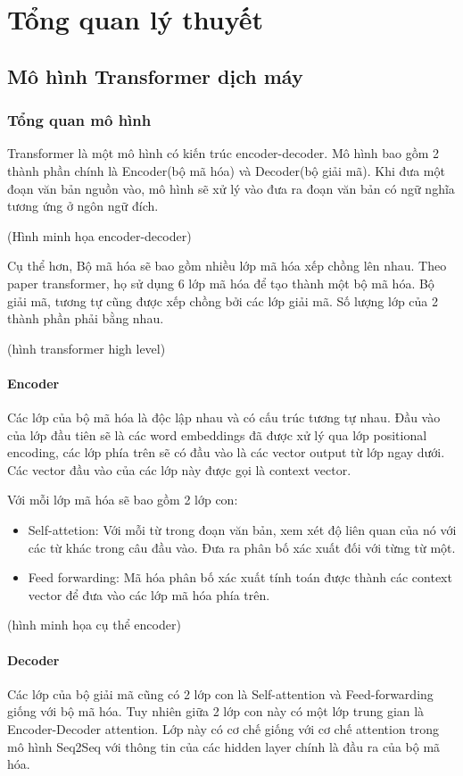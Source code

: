 \chapter{Tổng quan lý thuyết}
\label{Chapter2}
\section{Mô hình Transformer dịch máy}

\subsection{Tổng quan mô hình}

Transformer là một mô hình có kiến trúc encoder-decoder. Mô hình bao gồm 2 thành phần chính là Encoder(bộ mã hóa) và Decoder(bộ giải mã). Khi đưa một đoạn văn bản nguồn vào, mô hình sẽ xử lý vào đưa ra đoạn văn bản có ngữ nghĩa tương ứng ở ngôn ngữ đích.

(Hình minh họa encoder-decoder)

Cụ thể hơn, Bộ mã hóa sẽ bao gồm nhiều lớp mã hóa xếp chồng lên nhau. Theo paper transformer, họ sử dụng 6 lớp mã hóa để tạo thành một bộ mã hóa.  Bộ giải mã, tương tự cũng được xếp chồng bởi các lớp giải mã. Số lượng lớp của 2 thành phần phải bằng nhau.

(hình transformer high level)

\subsubsection{Encoder}
Các lớp của bộ mã hóa là độc lập nhau và có cấu trúc tương tự nhau. Đầu vào của lớp đầu tiên sẽ là các word embeddings đã được xử lý qua lớp positional encoding, các lớp phía trên sẽ có đầu vào là các vector output từ lớp ngay dưới. Các vector đầu vào của các lớp này được gọi là context vector.

Với mỗi lớp mã hóa sẽ bao gồm 2 lớp con:
\begin{itemize}
	\item Self-attetion: Với mỗi từ trong đoạn văn bản, xem xét độ liên quan của nó với các từ khác trong câu đầu vào. Đưa ra phân bố xác xuất đối với từng từ một.
	\item Feed forwarding: Mã hóa phân bố xác xuất tính toán được thành các context vector để đưa vào các lớp mã hóa phía trên.
\end{itemize}

(hình minh họa cụ thể encoder)

\subsubsection{Decoder}
Các lớp của bộ giải mã cũng có 2 lớp con là Self-attention và Feed-forwarding giống với bộ mã hóa. Tuy nhiên giữa 2 lớp con này có một lớp trung gian là Encoder-Decoder attention. Lớp này có cơ chế giống với cơ chế attention trong mô hình Seq2Seq với thông tin của các hidden layer chính là đầu ra của bộ mã hóa.

